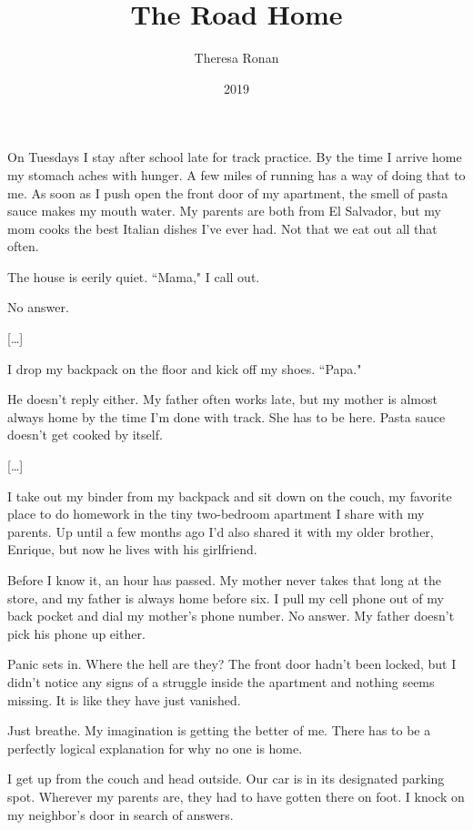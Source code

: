 \documentclass[10pt,a4paper]{article}
\newcommand{\qm}[1]{``#1"}
\begin{document}
\title{The Road Home}
\date{2019}
\author{Theresa Ronan}

\maketitle

\noindent\linenumbers On Tuesdays I stay after school late for track practice. By the time I arrive home my stomach aches with hunger. A few miles of running has a way of doing that to me. As soon as I push open the front door of my apartment, the smell of pasta sauce makes my mouth water. My parents are both from El Salvador, but my mom cooks the best Italian dishes I've ever had. Not that we eat out all that often.

The house is eerily quiet. \qm{Mama,} I call out.

No answer.

[\ldots]

I drop my backpack on the floor and kick off my shoes. \qm{Papa.}

He doesn't reply either. My father often works late, but my mother is almost always home by the time I'm done with track. She has to be here. Pasta sauce doesn't get cooked by itself.

[\ldots]

I take out my binder from my backpack and sit down on the couch, my favorite place to do homework in the tiny two-bedroom apartment I share with my parents. Up until a few months ago I'd also shared it with my older brother, Enrique, but now he lives with his girlfriend.

Before I know it, an hour has passed. My mother never takes that long at the store, and my father is always home before six. I pull my cell phone out of my back pocket and dial my mother's phone number. No answer. My father doesn't pick his phone up either.

Panic sets in. Where the hell are they? The front door hadn't been locked, but I didn't notice any signs of a struggle inside the apartment and nothing seems missing. It is like they have just vanished.

Just breathe. My imagination is getting the better of me. There has to be a perfectly logical explanation for why no one is home.

I get up from the couch and head outside. Our car is in its designated parking spot. Wherever my parents are, they had to have gotten there on foot. I knock on my neighbor's door in search of answers.
\end{document}
